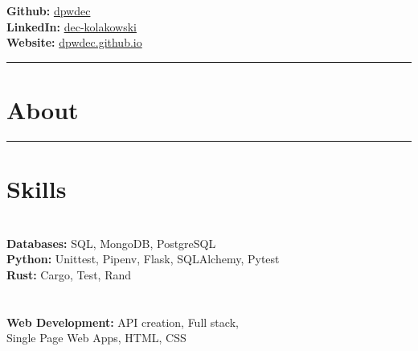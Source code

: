 \documentclass[12pt]{IEEEtran}
\newcommand{\cvrule}{\noindent\rule{8.5cm}{0.4pt}}
\begin{document}
\LARGE
{}
\small
\\
\\
\textbf{Github:} \href{https://github.com/dpwdec}{dpwdec}\\
\textbf{LinkedIn:} \href{https://www.linkedin.com/in/dec-kolakowski-256b3b86}{dec-kolakowski}\\
\textbf{Website:} \href{https://dpwdec.github.io}{dpwdec.github.io}\\

\cvrule

\section*{\textbf{About}}

\iffalse
\noindent{I am a software developer, a TDD enthusiast and an evangelist for clean code. I graduated with a first class degree from Trinity College in Musical Composition. I spent ten years making games and working on technology-driven art and animation projects. Through using code in these projects I discovered a love for programming and its expressive potential.}
\fi


\cvrule

\section*{\textbf{Skills}}

 \\[3pt]
\textbf{Databases:} SQL, MongoDB, PostgreSQL  \\[3pt]
\textbf{Python:} Unittest, Pipenv, Flask, SQLAlchemy, Pytest  \\[3pt]
\iffalse
\textbf{Adobe Suite:} Photoshop, Illustrator, Premiere  \\[3pt]
\fi
\textbf{Rust:} Cargo, Test, Rand  \\[3pt]
  \\[3pt]
 \\[3pt]
\textbf{Web Development:} API creation, Full stack, \\ Single Page Web Apps, HTML, CSS  %
\end{document}
